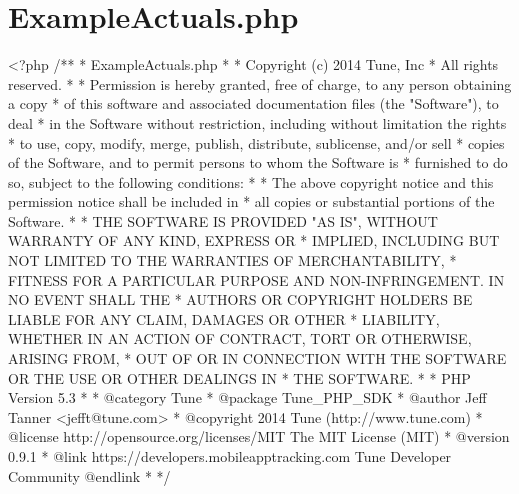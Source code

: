 \hypertarget{ExampleActuals_8php-example}{\section{Example\-Actuals.\-php}
}

\begin{DoxyCodeInclude}
<?php\textcolor{comment}{}
\textcolor{comment}{/**}
\textcolor{comment}{ * ExampleActuals.php}
\textcolor{comment}{ * }
\textcolor{comment}{ * Copyright (c) 2014 Tune, Inc}
\textcolor{comment}{ * All rights reserved.}
\textcolor{comment}{ *}
\textcolor{comment}{ * Permission is hereby granted, free of charge, to any person obtaining a copy}
\textcolor{comment}{ * of this software and associated documentation files (the "Software"), to deal}
\textcolor{comment}{ * in the Software without restriction, including without limitation the rights}
\textcolor{comment}{ * to use, copy, modify, merge, publish, distribute, sublicense, and/or sell}
\textcolor{comment}{ * copies of the Software, and to permit persons to whom the Software is}
\textcolor{comment}{ * furnished to do so, subject to the following conditions:}
\textcolor{comment}{ *}
\textcolor{comment}{ * The above copyright notice and this permission notice shall be included in}
\textcolor{comment}{ * all copies or substantial portions of the Software.}
\textcolor{comment}{ *}
\textcolor{comment}{ * THE SOFTWARE IS PROVIDED "AS IS", WITHOUT WARRANTY OF ANY KIND, EXPRESS OR}
\textcolor{comment}{ * IMPLIED, INCLUDING BUT NOT LIMITED TO THE WARRANTIES OF MERCHANTABILITY,}
\textcolor{comment}{ * FITNESS FOR A PARTICULAR PURPOSE AND NON-INFRINGEMENT. IN NO EVENT SHALL THE}
\textcolor{comment}{ * AUTHORS OR COPYRIGHT HOLDERS BE LIABLE FOR ANY CLAIM, DAMAGES OR OTHER}
\textcolor{comment}{ * LIABILITY, WHETHER IN AN ACTION OF CONTRACT, TORT OR OTHERWISE, ARISING FROM,}
\textcolor{comment}{ * OUT OF OR IN CONNECTION WITH THE SOFTWARE OR THE USE OR OTHER DEALINGS IN}
\textcolor{comment}{ * THE SOFTWARE.}
\textcolor{comment}{ *}
\textcolor{comment}{ * PHP Version 5.3}
\textcolor{comment}{ *}
\textcolor{comment}{ * @category  Tune}
\textcolor{comment}{ * @package   Tune\_PHP\_SDK}
\textcolor{comment}{ * @author    Jeff Tanner <jefft@tune.com>}
\textcolor{comment}{ * @copyright 2014 Tune (http://www.tune.com)}
\textcolor{comment}{ * @license   http://opensource.org/licenses/MIT The MIT License (MIT)}
\textcolor{comment}{ * @version   0.9.1}
\textcolor{comment}{ * @link      https://developers.mobileapptracking.com Tune Developer Community @endlink}
\textcolor{comment}{ *}
\textcolor{comment}{ */}


\end{DoxyCodeInclude}
